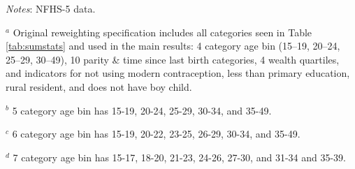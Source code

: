 \documentclass[12pt]{article}
\begin{document}

\newpage

\begin{landscape}
    


\begin{table}[H]
    \centering

    \begin{threeparttable}
            
    \caption{: Prepregnancy underweight estimates are robust to reweighting over different sets of variables}
    \label{specifications}
    \renewcommand{\arraystretch}{1.5}
    \footnotesize
    \setlength{\tabcolsep}{20pt}
    \resizebox{\textwidth}{!}{%
        
    }
    
    \scriptsize

    
    \begin{tablenotes}
        \item  \textit{Notes}: NFHS-5 data.
        \item $^a$ Original reweighting specification includes all categories seen in Table \ref{tab:sumstats} and used in the main results: 4 category age bin (15–19, 20–24, 25–29, 30–49), 10 parity \& time since last birth categories, 4 wealth quartiles, and indicators for not using modern contraception, less than primary education, rural resident, and does not have boy child.
        \item $^b$ 5 category age bin has 15-19, 20-24, 25-29, 30-34, and 35-49.
        \item $^c$ 6 category age bin has 15-19, 20-22, 23-25, 26-29, 30-34, and 35-49.
        \item $^d$ 7 category age bin has 15-17, 18-20, 21-23, 24-26, 27-30, and 31-34 and 35-39.
    \end{tablenotes}

    
    
    \end{threeparttable}
\end{table}


\end{landscape}
\end{document}
